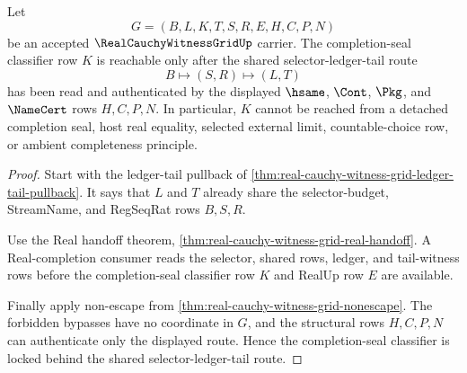 \begin{theorem}
\label{thm:real-cauchy-witness-grid-completion-seal-selector-lock}
Let
$$
G=(B,L,K,T,S,R,E,H,C,P,N)
$$
be an accepted $\RealCauchyWitnessGridUp$ carrier. The completion-seal classifier row $K$ is reachable only after the shared selector-ledger-tail route
$$
B \longmapsto (S,R) \longmapsto (L,T)
$$
has been read and authenticated by the displayed $\hsame$, $\Cont$, $\Pkg$, and $\NameCert$ rows $H,C,P,N$. In particular, $K$ cannot be reached from a detached completion seal, host real equality, selected external limit, countable-choice row, or ambient completeness principle.
\end{theorem}
\begin{proof}
Start with the ledger-tail pullback of \autoref{thm:real-cauchy-witness-grid-ledger-tail-pullback}. It says that $L$ and $T$ already share the selector-budget, StreamName, and RegSeqRat rows $B,S,R$.

Use the Real handoff theorem, \autoref{thm:real-cauchy-witness-grid-real-handoff}. A Real-completion consumer reads the selector, shared rows, ledger, and tail-witness rows before the completion-seal classifier row $K$ and RealUp row $E$ are available.

Finally apply non-escape from \autoref{thm:real-cauchy-witness-grid-nonescape}. The forbidden bypasses have no coordinate in $G$, and the structural rows $H,C,P,N$ can authenticate only the displayed route. Hence the completion-seal classifier is locked behind the shared selector-ledger-tail route.
\end{proof}


